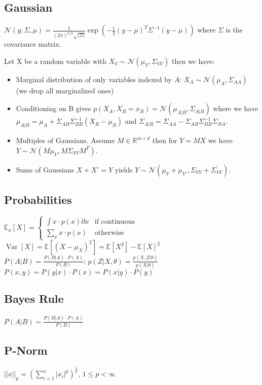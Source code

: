 \documentclass[11pt]{article}
\newcommand{\gauss}{\mathcal{N}}
\begin{document}
\begin{multicols*}{3}
\subsection*{Gaussian}
$\gauss(y;\Sigma,\mu) = \frac{1}{(2\pi)^{n/2} \sqrt{|\Sigma|}} \exp \left( - \frac{1}{2} (y-\mu)^T \Sigma^{-1}(y-\mu) \right) $ where $\Sigma$ is the covariance matrix.

Let X be a random variable with $X_V \sim \gauss(\mu_V,\Sigma_{VV})$ then we have:
\begin{itemize}
	\item Marginal distribution of only variables indexed by $A$: $X_A \sim \gauss(\mu_A,\Sigma_{AA})$ (we drop all marginalized ones)
	\item Conditioning on B gives $p(X_A,X_B = x_B) = \gauss(\mu_{A|B},\Sigma_{A|B})$ where we have $\mu_{A|B} = \mu_A + \Sigma_{AB}\Sigma_{BB}^{-1}(X_B - \mu_B)$ and $\Sigma_{A|B} = \Sigma_{AA} - \Sigma_{AB}\Sigma_{BB}^{-1}\Sigma_{BA}$.
	\item Multiples of Gaussians. Assume $M\in \mathbb{R}^{m\times d}$ then for $Y=MX$ we have $Y\sim \gauss (M\mu_V,M\Sigma_{VV}M^T)$.
	\item Sums of Gaussians $X+X'=Y$ yields $Y\sim \gauss (\mu_V + \mu_{V'} ,\Sigma_{VV} + \Sigma^{'}_{VV})$.
\end{itemize}


\subsection*{Probabilities}
$\mathbb{E}_x[X] = \begin{cases}
	\int x \cdot p(x) \partial x  & \text{if continuous}\\
	\sum_x x \cdot p(x) & \text{otherwise}
\end{cases}$\\
$\operatorname{Var}[X] = \mathbb{E}[(X-\mu_X)^2] = \mathbb{E}[X^2] - \mathbb{E}[X]^2$\\
$P(A|B) = \frac{P(B|A) \cdot P(A)}{P(B)}$; $p(Z|X,\theta) = \frac{p(X,Z|\theta)}{p(X|\theta)}$\\
$P(x,y) = P(y|x) \cdot  P(x) = P(x|y) \cdot P(y)$

\subsection*{{Bayes Rule}}
$P(A|B) = \frac{P(B|A) \cdot P(A)}{P(B)}$

\subsection*{P-Norm}
$||x||_p = (\sum_{i=1}^n|x_i|^p)^{\frac{1}{p}}$, $1 \leq p < \infty$


\end{multicols*}
\end{document}
